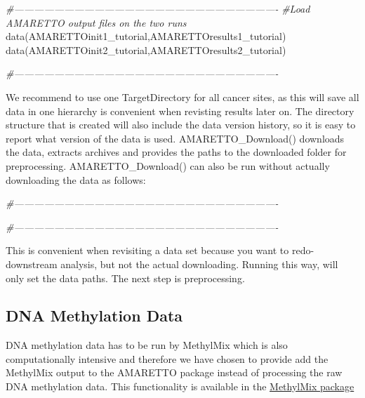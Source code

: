 \documentclass[8pt,a4,]{article}
\newcommand{\hlcom}[1]{\textcolor[rgb]{0.502,0.502,0.502}{\textit{#1}}}%
\newcommand{\hlstd}[1]{\textcolor[rgb]{0.251,0.251,0.251}{#1}}%
\newcommand{\hlkwd}[1]{\textcolor[rgb]{0.878,0.439,0.125}{#1}}%
\newenvironment{Shaded}{\begin{myshaded}}{\end{myshaded}}
\newcommand{\KeywordTok}[1]{\hlkwd{#1}}
\newcommand{\CommentTok}[1]{\hlcom{#1}}
\newcommand{\NormalTok}[1]{\hlstd{#1}}
\begin{document}
\begin{Shaded}
\begin{Highlighting}[]
\CommentTok{#-------------------------------------------------------------------------------}
\CommentTok{#Load AMARETTO output files on the two runs }
\KeywordTok{data}\NormalTok{(AMARETTOinit1_tutorial,AMARETTOresults1_tutorial)}
\KeywordTok{data}\NormalTok{(AMARETTOinit2_tutorial,AMARETTOresults2_tutorial)}

\CommentTok{#-------------------------------------------------------------------------------}
\end{Highlighting}
\end{Shaded}

We recommend to use one TargetDirectory for all cancer sites, as this
will save all data in one hierarchy is convenient when revisting results
later on. The directory structure that is created will also include the
data version history, so it is easy to report what version of the data
is used. AMARETTO\_Download() downloads the data, extracts archives and
provides the paths to the downloaded folder for preprocessing.
AMARETTO\_Download() can also be run without actually downloading the
data as follows:

\begin{Shaded}
\begin{Highlighting}[]
\CommentTok{#-------------------------------------------------------------------------------}



\CommentTok{#-------------------------------------------------------------------------------}
\end{Highlighting}
\end{Shaded}

This is convenient when revisiting a data set because you want to
redo-downstream analysis, but not the actual downloading. Running this
way, will only set the data paths. The next step is preprocessing.

\subsection{DNA Methylation Data}\label{dna-methylation-data}

DNA methylation data has to be run by MethylMix which is also
computationally intensive and therefore we have chosen to provide add
the MethylMix output to the AMARETTO package instead of processing the
raw DNA methylation data. This functionality is available in the
\href{https://www.bioconductor.org/packages/release/bioc/html/MethylMix.html}{MethylMix
package}
\end{document}

